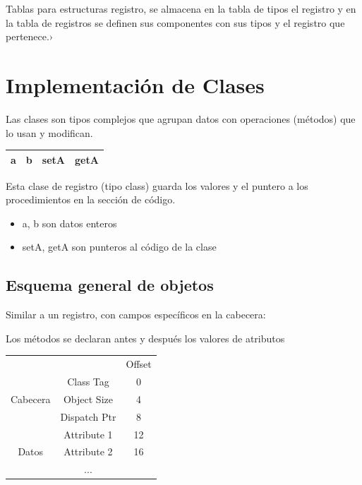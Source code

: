 \documentclass[12pt, twoside, openright]{report} %
\begin{document}
Tablas para estructuras registro, se almacena en la tabla de tipos el registro y en la tabla de registros se definen sus componentes con sus tipos y el registro que pertenece.›
\begin{figure}[H]
	{\def\svgwidth{.9\textwidth}
		}
\end{figure}

\section{Implementación de Clases}
Las clases son tipos complejos que agrupan datos con operaciones (métodos) que lo usan y modifican.

\begin{table}[h]
	\begin{tabular}{|c|c|c|c|}
		\hline
		a & b & setA & getA \\ \hline
	\end{tabular}
\end{table}

Esta clase de registro (tipo class) guarda los valores y el puntero a los procedimientos en la sección de código.
\begin{itemize}
	\item a,  b son datos enteros
	\item setA, getA son punteros al código de la clase
\end{itemize}

\subsection{Esquema general de objetos}
Similar a un registro, con campos específicos en la cabecera:

Los métodos se declaran antes y después los valores de atributos

\begin{table}[h]
	\begin{tabular}{ccc}
		                                               &                                   & Offset \\ \cline{2-2}
		\multicolumn{1}{c|}{\multirow{3}{*}{Cabecera}} & \multicolumn{1}{c|}{Class Tag}    & 0      \\ \cline{2-2}
		\multicolumn{1}{c|}{}                          & \multicolumn{1}{c|}{Object Size}  & 4      \\ \cline{2-2}
		\multicolumn{1}{c|}{}                          & \multicolumn{1}{c|}{Dispatch Ptr} & 8      \\ \cline{2-2}
		\multicolumn{1}{c|}{\multirow{3}{*}{Datos}}    & \multicolumn{1}{c|}{Attribute 1}  & 12     \\ \cline{2-2}
		\multicolumn{1}{c|}{}                          & \multicolumn{1}{c|}{Attribute 2}  & 16     \\ \cline{2-2}
		\multicolumn{1}{c|}{}                          & \multicolumn{1}{c|}{...}          &        \\ \cline{2-2}
	\end{tabular}
\end{table}
\end{document}
